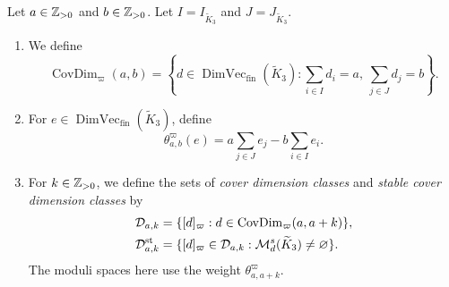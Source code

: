 \begin{definition}\label{def:cover-dimension-classes}
Let $a\in\mathbb Z_{>0}$ and $b\in\mathbb Z_{>0}$. Let
$I=I_{\widetilde K_3}$ and $J=J_{\widetilde K_3}$.
\begin{enumerate}[font=\itshape]
\item We define
\[
 \operatorname{CovDim}_{\varpi}(a,b)=
 \left\{d\in\operatorname{DimVec}_{\mathrm{fin}}(\widetilde K_3):
 \sum_{i\in I}d_i=a,\ \sum_{j\in J}d_j=b\right\}.
\]
\item For $e\in\operatorname{DimVec}_{\mathrm{fin}}(\widetilde K_3)$, define
\[
 \theta^{\varpi}_{a,b}(e)=a\sum_{j\in J}e_j-b\sum_{i\in I}e_i.
\]
\item For $k\in\mathbb Z_{>0}$, we define the sets of \textit{cover dimension classes}
and \textit{stable cover dimension classes} by
\[
\begin{aligned}
 \mathcal D_{a,k}&=\{[d]_{\varpi}:d\in\operatorname{CovDim}_{\varpi}(a,a+k)\},\\
 \mathcal D^{\mathrm{st}}_{a,k}&=\{[d]_{\varpi}\in\mathcal D_{a,k}:
 \mathcal M^s_d(\widetilde K_3)\ne\varnothing\}.
\end{aligned}
\]
The moduli spaces here use the weight $\theta^{\varpi}_{a,a+k}$.
\end{enumerate}
\end{definition}

